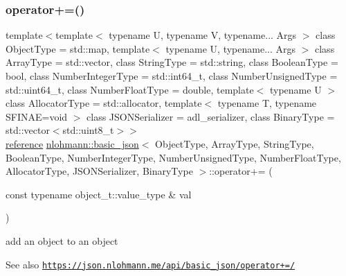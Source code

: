\subsubsection{\texorpdfstring{operator+=()}{operator+=()}\hspace{0.1cm}{\footnotesize\ttfamily [3/4]}}
{\footnotesize\ttfamily template$<$template$<$ typename U, typename V, typename... Args $>$ class Object\+Type = std\+::map, template$<$ typename U, typename... Args $>$ class Array\+Type = std\+::vector, class String\+Type  = std\+::string, class Boolean\+Type  = bool, class Number\+Integer\+Type  = std\+::int64\+\_\+t, class Number\+Unsigned\+Type  = std\+::uint64\+\_\+t, class Number\+Float\+Type  = double, template$<$ typename U $>$ class Allocator\+Type = std\+::allocator, template$<$ typename T, typename S\+F\+I\+N\+A\+E=void $>$ class J\+S\+O\+N\+Serializer = adl\+\_\+serializer, class Binary\+Type  = std\+::vector$<$std\+::uint8\+\_\+t$>$$>$ \\
\hyperlink{classnlohmann_1_1basic__json_a220ae98554a76205fb7f8822d36b2d5a}{reference} \hyperlink{classnlohmann_1_1basic__json}{nlohmann\+::basic\+\_\+json}$<$ Object\+Type, Array\+Type, String\+Type, Boolean\+Type, Number\+Integer\+Type, Number\+Unsigned\+Type, Number\+Float\+Type, Allocator\+Type, J\+S\+O\+N\+Serializer, Binary\+Type $>$\+::operator+= (\begin{DoxyParamCaption}\item[{const typename object\+\_\+t\+::value\+\_\+type \&}]{val }\end{DoxyParamCaption})\hspace{0.3cm}{\ttfamily [inline]}}



add an object to an object 

\begin{DoxySeeAlso}{See also}
\href{https://json.nlohmann.me/api/basic_json/operator+=/}{\tt https\+://json.\+nlohmann.\+me/api/basic\+\_\+json/operator+=/} 
\end{DoxySeeAlso}
\mbox{\label{classnlohmann_1_1basic__json_ac48302a8b4f8c2a6e30c2a7bff6abc49}} 
